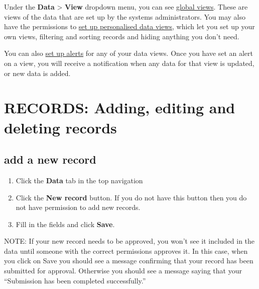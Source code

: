 \documentclass{ctrlo-int-toc}
\begin{document}
Under the \textbf{Data} {\textgreater} \textbf{View} dropdown menu, you can see \hyperref[subsec:globalview]{global views}. These are views of the data that are set up by the systems administrators. You may also have the permissions to \hyperref[subsec:personalview]{set up personalised data views}, which let you set up your own views, filtering and sorting records and hiding anything you don't need.

You can also \hyperref[subsec:setalert]{set up alerts} for any of your data views. Once you have set an alert on a view, you will receive a notification when any data for that view is updated, or new data is added.

\clearpage\section[RECORDS: Adding, editing and deleting records]{RECORDS: Adding, editing and deleting records}
\subsection[add a new record]{add a new record}
\label{subsec:addrecord}
\begin{enumerate}
\item Click the \textbf{Data} tab in the top navigation 
\item Click the \textbf{New record} button. If you do not have this button then you do not have permission to add new records.
\item Fill in the fields and click \textbf{Save}.
\end{enumerate}
\begin{notebox}
NOTE: If your new record needs to be approved, you won't see it included in the data until someone with the correct permissions approves it. In this case, when you click on Save you should see a message confirming that your record has been submitted for approval. Otherwise you should see a message saying that your ``Submission has been completed successfully.''
\end{notebox}
\end{document}
